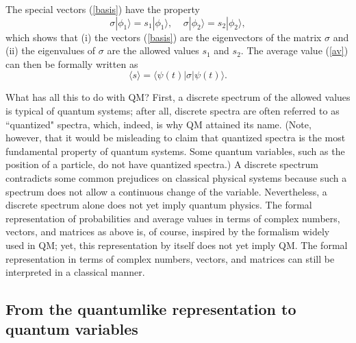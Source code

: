 \documentclass[12pt]{article}
\begin{document}
The special vectors (\ref{basis}) have the property 
\begin{equation}\label{s12}
\sigma |\phi_1\rangle=s_1|\phi_1\rangle , \;\;\;\;
\sigma |\phi_2\rangle=s_2|\phi_2\rangle ,
\end{equation}
which shows that (i) the vectors (\ref{basis}) are the eigenvectors of 
the matrix $\sigma$ and (ii) the eigenvalues of $\sigma$ are 
the allowed values $s_1$ and $s_2$.  
The average value (\ref{av}) can then be formally written as
\begin{equation}
\langle s \rangle =\langle \psi(t)|\sigma |\psi(t) \rangle .
\end{equation}

What has all this to do with QM? First, a discrete spectrum 
of the allowed values is typical of quantum systems; after all, 
discrete spectra are often referred to as ``quantized" spectra,
which, indeed, is why QM attained its name.
(Note, however, that it would be misleading
to claim that quantized spectra is the most fundamental property of
quantum systems. Some quantum variables, such as the position of a particle,
do not have quantized spectra.)
A discrete spectrum contradicts some common
prejudices on classical physical systems because
such a spectrum does not allow a continuous change of the variable.
Nevertheless, a discrete spectrum alone does not yet imply
quantum physics. The formal representation of probabilities and average 
values in terms of complex numbers, vectors, and matrices
as above is, of course, inspired by the 
formalism widely used in QM; yet, this representation by itself 
does not yet imply QM. The formal representation in terms of
complex numbers, vectors, and matrices can still be interpreted 
in a classical manner.

\subsection{From the quantumlike representation to quantum variables}
\end{document}
